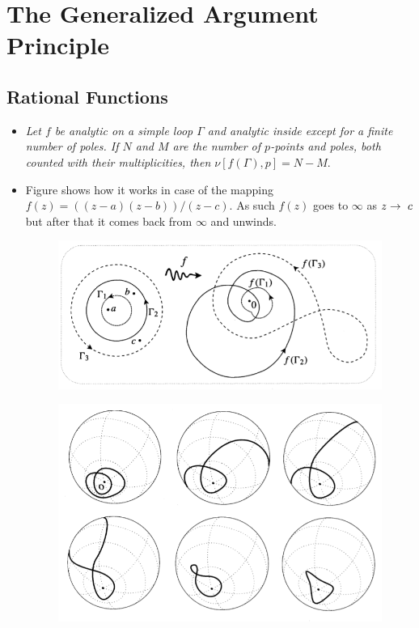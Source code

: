 \documentclass[12pt]{article}
\def\tt{\textit}
\def\rto{\ensuremath\rightarrow\ }
\begin{document}
\section{The Generalized Argument Principle}
\subsection{Rational Functions}
\begin{itemize}
    \item \tt{Let $f$ be analytic on a simple loop $\Gamma$ and analytic inside except for a finite number of poles. If $N$ and $M$ are the number of $p$-points and poles, both counted with their multiplicities, then $\nu[f(\Gamma),p]=N-M$}.
    \item Figure shows how it works in case of the mapping $f(z)=((z-a)(z-b))/(z-c)$. As such $f(z)$ goes to $\infty$ as $z\rto c$ but after that it comes back from $\infty$ and unwinds.
    \begin{figure}[h!]
        \centering
        \includegraphics[scale=0.7]{fig_9}
        \label{f9}
    \end{figure}
    \begin{figure}[h!]
        \centering
        \includegraphics[scale=0.7]{fig_10}
        \label{f10}
    \end{figure}
\end{itemize}
\end{document}
